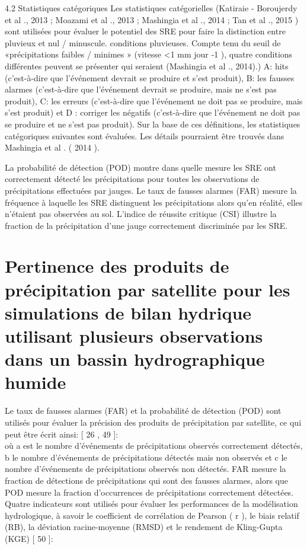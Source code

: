 4.2 Statistiques catégoriques
Les statistiques catégorielles (Katiraie ‐ Boroujerdy et al ., 2013 ; Moazami et al ., 2013 ; Mashingia et al ., 2014 ; Tan et al ., 2015 ) sont utilisées pour évaluer le potentiel des SRE pour faire la distinction entre pluvieux et nul / minuscule. conditions pluvieuses. Compte tenu du seuil de «précipitations faibles / minimes » (vitesse <1 mm jour ‐1 ), quatre conditions différentes peuvent se présenter qui seraient (Mashingia et al ., 2014).) A: hits (c'est-à-dire que l'événement devrait se produire et s'est produit), B: les fausses alarmes (c'est-à-dire que l'événement devrait se produire, mais ne s'est pas produit), C: les erreurs (c'est-à-dire que l'événement ne doit pas se produire, mais s'est produit) et D : corriger les négatifs (c'est-à-dire que l'événement ne doit pas se produire et ne s'est pas produit). Sur la base de ces définitions, les statistiques catégoriques suivantes sont évaluées. Les détails pourraient être trouvés dans Mashingia et al . ( 2014 ).

La probabilité de détection (POD) montre dans quelle mesure les SRE ont correctement détecté les précipitations pour toutes les observations de précipitations effectuées par jauges.
Le taux de fausses alarmes (FAR) mesure la fréquence à laquelle les SRE distinguent les précipitations alors qu'en réalité, elles n'étaient pas observées au sol.
L'indice de réussite critique (CSI) illustre la fraction de la précipitation d'une jauge correctement discriminée par les SRE. \cite{alijanian_evaluation_2017}
\section{Pertinence des produits de précipitation par satellite pour les simulations de bilan hydrique utilisant plusieurs observations dans un bassin hydrographique humide}
Le taux de fausses alarmes (FAR) et la probabilité de détection (POD) sont utilisés pour évaluer la précision des produits de précipitation par satellite, ce qui peut être écrit ainsi: [ 26 , 49 ]:\\
où a est le nombre d'événements de précipitations observés correctement détectés, b le nombre d'événements de précipitations détectés mais non observés et c le nombre d'événements de précipitations observés non détectés. FAR mesure la fraction de détections de précipitations qui sont des fausses alarmes, alors que POD mesure la fraction d'occurrences de précipitations correctement détectées.
Quatre indicateurs sont utilisés pour évaluer les performances de la modélisation hydrologique, à savoir le coefficient de corrélation de Pearson ( r ), le biais relatif (RB), la déviation racine-moyenne (RMSD) et le rendement de Kling-Gupta (KGE) [ 50 ]: \cite{zhang_suitability_2019}
